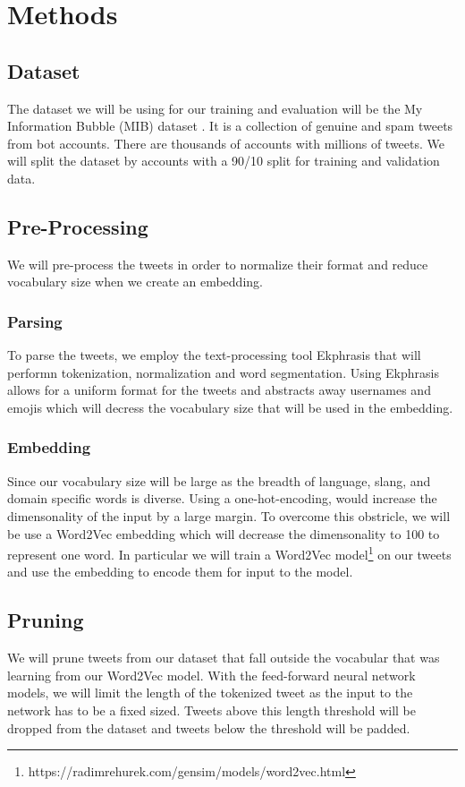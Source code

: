 \section{Methods}
\label{sec:methods}

\subsection{Dataset} The dataset we will be using for our training and
evaluation will be the My Information Bubble (MIB) dataset
\citep{Cresci:2017:PSS:3041021.3055135}. It is a collection of genuine
and spam tweets from bot accounts. There are thousands of accounts
with millions of tweets. We will split the dataset by accounts with a
90/10 split for training and validation data.

\subsection{Pre-Processing} We will pre-process the tweets in order to
normalize their format and reduce vocabulary size when we create an
embedding.

\subsubsection{Parsing} To parse the tweets, we employ the
text-processing tool Ekphrasis
\citep{baziotis-pelekis-doulkeridis:2017:SemEval2} that will performn
tokenization, normalization and word segmentation. Using Ekphrasis
allows for a uniform format for the tweets and abstracts away
usernames and emojis which will decress the vocabulary size that will
be used in the embedding.

\subsubsection{Embedding} Since our vocabulary size will be large as
the breadth of language, slang, and domain specific words is diverse.
Using a one-hot-encoding, would increase the dimensonality of the
input by a large margin. To overcome this obstricle, we will be use a
Word2Vec embedding \citep{Mikolov:2013:DRW:2999792.2999959} which will
decrease the dimensonality to 100 to represent one word. In particular
we will train a Word2Vec
model\footnote{https://radimrehurek.com/gensim/models/word2vec.html}
on our tweets and use the embedding to encode them for input to the
model.

\subsection{Pruning} We will prune tweets from our dataset that fall
outside the vocabular that was learning from our Word2Vec model. With
the feed-forward neural network models, we will limit the length of
the tokenized tweet as the input to the network has to be a fixed
sized. Tweets above this length threshold will be dropped from the
dataset and tweets below the threshold will be padded.

